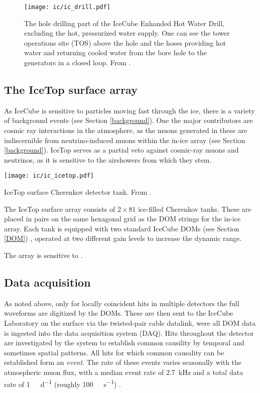 \begin{figure}[]
    \texttt{[image: ic/ic\_drill.pdf]}
    \caption[IceCube enhanced hot water drill]{The hole drilling part of the IceCube Enhanded Hot Water Drill, excluding the hot, pressurized water supply. One can see the tower operations site (TOS) above the hole and the hoses providing hot water and returning cooled water from the bore hole to the generators in a closed loop. From \cite{Benson2014}.}
\end{figure}

\subsection{The IceTop surface array}
As IceCube is sensitive to particles moving fast through the ice, there is a variety of background events (see Section \ref{background}). One the major contributors are cosmic ray interactions in the atmosphere, as the muons generated in these are indiscernible from neutrino-induced muons within the in-ice array (see Section \ref{background}). IceTop serves as a partial veto against cosmic-ray muons and neutrinos, as it is sensitive to the airshowers from which they stem.

\begin{marginfigure}
    \texttt{[image: ic/ic\_icetop.pdf]}
    \caption[IceTop detector]{IceTop surface Cherenkov detector tank. From \cite{Abbasi2013}.}
\end{marginfigure}

The IceTop surface array consists of $2\times81$ ice-filled Cherenkov tanks. These are placed in pairs on the same hexagonal grid as the DOM strings for the in-ice array. Each tank is equipped with two standard IceCube DOMs (see Section \ref{DOM}) \cite{Abbasi2013}, operated at two different gain levels to increase the dynamic range.

The array is sensitive to .

\subsection{Data acquisition}\label{data_acquisition}
As noted above, only for locally coincident hits in multiple detectors the full waveforms are digitized by the DOMs. These are then sent to the IceCube Laboratory on the surface via the twisted-pair cable datalink, were all DOM data is ingested into the data acquisition system (DAQ). Hits throughout the detector are investigated by the system to establish common causility by temporal and sometimes spatial patterns. All hits for which common causality can be established form an \textit{event}. The rate of these events varies seasonally with the atmospheric muon flux, with a median event rate of \SI{2.7}{\kilo\Hz} and a total data rate of \SI{1}{\tera\byte\per\day} (roughly \SI{100}{\mega\bit\per\second}) \cite{Aartsen2017}.

